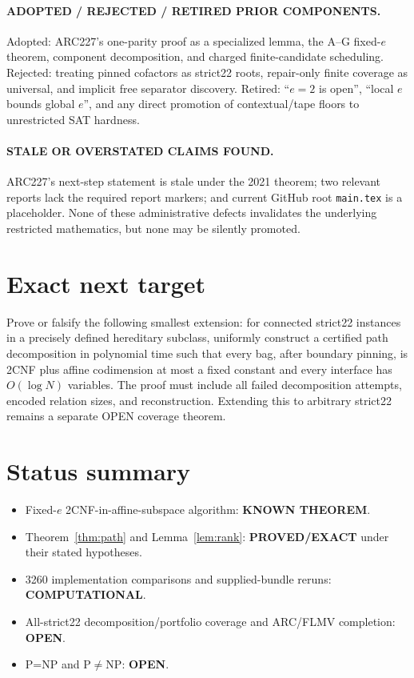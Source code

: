 \documentclass[10pt]{article}
\begin{document}
\paragraph{ADOPTED / REJECTED / RETIRED PRIOR COMPONENTS.}
Adopted: ARC227's one-parity proof as a specialized lemma, the A--G fixed-$e$ theorem, component
decomposition, and charged finite-candidate scheduling.  Rejected: treating pinned cofactors as
strict22 roots, repair-only finite coverage as universal, and implicit free separator discovery.
Retired: ``$e=2$ is open'', ``local $e$ bounds global $e$'', and any direct promotion of
contextual/tape floors to unrestricted SAT hardness.

\paragraph{STALE OR OVERSTATED CLAIMS FOUND.}
ARC227's next-step statement is stale under the 2021 theorem; two relevant reports lack the
required report markers; and current GitHub root \texttt{main.tex} is a placeholder.  None of
these administrative defects invalidates the underlying restricted mathematics, but none may
be silently promoted.

\section{Exact next target}
Prove or falsify the following smallest extension: for connected strict22 instances in a
precisely defined hereditary subclass, uniformly construct a certified path decomposition in
polynomial time such that every bag, after boundary pinning, is 2CNF plus affine codimension at
most a fixed constant and every interface has $O(\log N)$ variables.  The proof must include
all failed decomposition attempts, encoded relation sizes, and reconstruction.  Extending this
to arbitrary strict22 remains a separate OPEN coverage theorem.

\section*{Status summary}
\begin{itemize}
\item Fixed-$e$ 2CNF-in-affine-subspace algorithm: \textbf{KNOWN THEOREM}.
\item Theorem~\ref{thm:path} and Lemma~\ref{lem:rank}: \textbf{PROVED/EXACT} under their stated hypotheses.
\item 3260 implementation comparisons and supplied-bundle reruns: \textbf{COMPUTATIONAL}.
\item All-strict22 decomposition/portfolio coverage and ARC/FLMV completion: \textbf{OPEN}.
\item P=NP and P$\ne$NP: \textbf{OPEN}.
\end{itemize}
\end{document}
